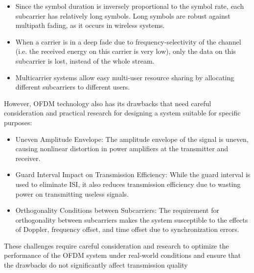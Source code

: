\begin{itemize}
    \item Since the symbol duration is inversely proportional to the symbol rate, each subcarrier has relatively long symbols. Long symbols are robust against multipath fading, as it occurs in wireless systems.
    \item When a carrier is in a deep fade due to frequency-selectivity of the channel (i.e. the received energy on this carrier is very low), only the data on this subcarrier is lost, instead of the whole stream.
    \item Multicarrier systems allow easy multi-user resource sharing by allocating different subcarriers to different users.
\end{itemize}
However, OFDM technology also has its drawbacks that need careful consideration and practical research for designing a system suitable for specific purposes:
\begin{itemize}
    \item Uneven Amplitude Envelope: The amplitude envelope of the signal is uneven, causing nonlinear distortion in power amplifiers at the transmitter and receiver.
    \item Guard Interval Impact on Transmission Efficiency: While the guard interval is used to eliminate ISI, it also reduces transmission efficiency due to wasting power on transmitting useless signals.
    \item Orthogonality Conditions between Subcarriers: The requirement for orthogonality between subcarriers makes the system susceptible to the effects of Doppler, frequency offset, and time offset due to synchronization errors.
\end{itemize}
These challenges require careful consideration and research to optimize the performance of the OFDM system under real-world conditions and ensure that the drawbacks do not significantly affect transmission quality


